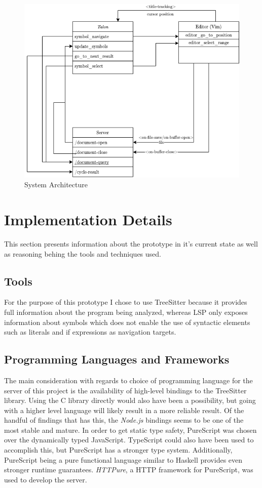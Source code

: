 \documentclass[../thesis.tex]{subfiles}
\begin{document}
\begin{figure}[htpb]
    \centering
    \includegraphics[width=0.8\linewidth]{images/architecture.png}
    \caption{System Architecture}%
    \label{fig:architecture}
\end{figure}

\section{Implementation Details}%
\label{sec:implementation}
This section presents information about the prototype in it's current state as well as reasoning behing the tools and techniques used.
\subsection{Tools}%
\label{sub:tools}
For the purpose of this prototype I chose to use TreeSitter because it provides full information about the program
being analyzed, whereas LSP only exposes information about symbols which does not enable the use of
syntactic elements such as literals and if expressions as navigation targets.

\subsection{Programming Languages and Frameworks}
The main consideration with regards to choice of programming language for the server of this project is the availability of high-level bindings to the TreeSitter library.
Using the C library directly would also have been a possibility, but going with a higher level language will likely result in a more reliable result.
Of the handful of findings that has this, the \textit{Node.js} bindings seems to be one of the most stable and mature.
In order to get static type safety, PureScript was chosen over the dynamically typed JavaScript.
TypeScript could also have been used to accomplish this, but PureScript has a stronger type system.
Additionally, PureScript being a pure functional language similar to Haskell provides even stronger runtime guarantees.
\textit{HTTPure}, a HTTP framework for PureScript, was used to develop the server.
\end{document}
